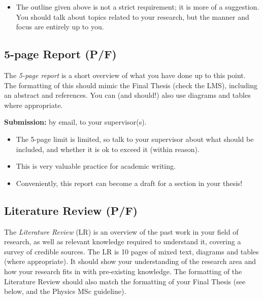 \documentclass[11pt, oneside, a4paper]{article}
\newcommand{\tipscolor}{ForestGreen}
\begin{document}
\begin{tcolorbox}[colback=\tipscolor!5!white,colframe=\tipscolor!50!white,title={Tips \& Tricks (cont.)}]
    \begin{itemize}
        \item The outline given above is not a strict requirement; it is more of a suggestion. You should talk about topics related to your research, but the manner and focus are entirely up to you.
    \end{itemize}
\end{tcolorbox}


\subsection*{5-page Report (P/F)}\label{Report}

The \textit{5-page report} is a short overview of what you have done up to this point. 
The formatting of this should mimic the Final Thesis (check the LMS), including an abstract and references.
You can (and should!) also use diagrams and tables where appropriate. 

\noindent
\textbf{Submission:} by email, to your supervisor(s). 

\begin{tcolorbox}[colback=\tipscolor!5!white,colframe=\tipscolor!50!white,title={Tips \& Tricks}]
    \begin{itemize}
        \item The 5-page limit is limited, so talk to your supervisor about what should be included, and whether it is ok to exceed it (within reason). 
        \item This is very valuable practice for academic writing.
        \item Conveniently, this report can become a draft for a section in your thesis!
    \end{itemize}
\end{tcolorbox}

\subsection*{Literature Review (P/F)}\label{LitReview}

The \textit{Literature Review} (LR) is an overview of the past work in your field of research, as well as relevant knowledge required to understand it, covering a survey of credible sources. 
The LR is 10 pages of mixed text, diagrams and tables (where appropriate). 
It should show your understanding of the research area and how your research fits in with pre-existing knowledge. 
The formatting of the Literature Review should also match the formatting of your Final Thesis (see below, and the Physics MSc guideline). 
\end{document}
